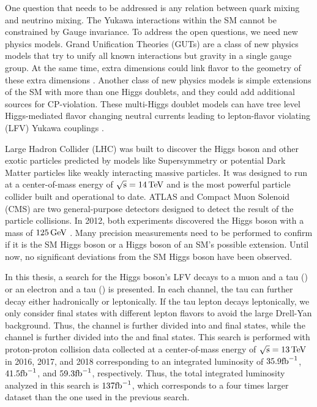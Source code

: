 One question that needs to be addressed is any relation between quark mixing and neutrino mixing. The Yukawa interactions within the SM cannot be constrained by Gauge invariance. To address the open questions, we need new physics models. Grand Unification Theories (GUTs) are a class of new physics models that try to unify all known interactions but gravity in a single gauge group. At the same time, extra dimensions could link flavor to the geometry of these extra dimensions \cite{Raidal:2008jk}. Another class of new physics models is simple extensions of the SM with more than one Higgs doublets, and they could add additional sources for CP-violation. These multi-Higgs doublet models can have tree level Higgs-mediated flavor changing neutral currents leading to lepton-flavor violating (LFV) Yukawa couplings \cite{Raidal:2008jk}.

Large Hadron Collider (LHC) \cite{Evans:2008zzb} was built to discover the Higgs boson and other exotic particles predicted by models like Supersymmetry or potential Dark Matter particles like weakly interacting massive particles. It was designed to run at a center-of-mass energy of $\sqrt{\text{s}} = 14 \,\text{Te\hspace{-.08em}V}$ and is the most powerful particle collider built and operational to date. ATLAS and Compact Muon Solenoid (CMS) are two general-purpose detectors designed to detect the result of the particle collisions. In 2012, both experiments discovered the Higgs boson with a mass of $125 \,\text{Ge\hspace{-.08em}V}$ \cite{Aad:2012tfa, Chatrchyan:2012ufa}. Many precision measurements need to be performed to confirm if it is the SM Higgs boson or a Higgs boson of an SM's possible extension. Until now, no significant deviations from the SM Higgs boson have been observed.

In this thesis, a search for the Higgs boson's LFV decays to a muon and a tau (\mutau) or an electron and a tau (\etau) is presented. In each channel, the tau can further decay either hadronically or leptonically. If the tau lepton decays leptonically, we only consider final states with different lepton flavors to avoid the large Drell-Yan background. Thus, the \mutau channel is further divided into \muhad and \mue final states, while the \etau channel is further divided into the \ehad and \emu final states. This search is performed with proton-proton collision data collected at a center-of-mass energy of $\sqrt{\text{s}} = 13 \,\text{Te\hspace{-.08em}V}$ in 2016, 2017, and 2018 corresponding to an integrated luminosity of $35.9 \text{fb}^{-1}$, $41.5 \text{fb}^{-1}$, and $59.3 \text{fb}^{-1}$, respectively. Thus, the total integrated luminosity analyzed in this search is $137 \text{fb}^{-1}$, which corresponds to a four times larger dataset than the one used in the previous search.

